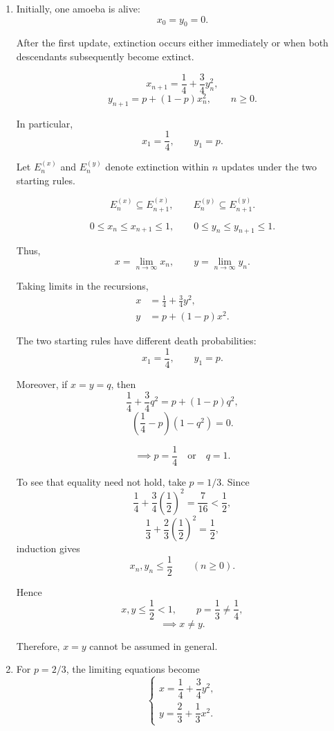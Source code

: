 \documentclass[11pt,a4paper]{article}
\begin{document}
\begin{enumerate}


\item[(a)]

Initially, one amoeba is alive:
\[
x_0=y_0=0.
\]

After the first update, extinction occurs either immediately
or when both descendants subsequently become extinct.

\[
x_{n+1}
=\frac14+\frac34 y_n^2,
\]
\[
y_{n+1}
=p+(1-p)x_n^2,
\qquad n\geq0.
\]

In particular,
\[
x_1=\frac14,\qquad y_1=p.
\]

Let $E_n^{(x)}$ and $E_n^{(y)}$ denote extinction within
$n$ updates under the two starting rules.

\[
E_n^{(x)}\subseteq E_{n+1}^{(x)},
\qquad
E_n^{(y)}\subseteq E_{n+1}^{(y)}.
\]

\[
0\leq x_n\leq x_{n+1}\leq1,
\qquad
0\leq y_n\leq y_{n+1}\leq1.
\]

Thus,
\[
x=\lim_{n\to\infty}x_n,
\qquad
y=\lim_{n\to\infty}y_n.
\]

Taking limits in the recursions,
\[
\begin{aligned}
x&=\frac14+\frac34 y^2,\\
y&=p+(1-p)x^2.
\end{aligned}
\]

The two starting rules have different death probabilities:
\[
x_1=\frac14,\qquad y_1=p.
\]

Moreover, if $x=y=q$, then
\[
\frac14+\frac34q^2
=p+(1-p)q^2,
\]
\[
\left(\frac14-p\right)(1-q^2)=0.
\]

\[
\implies
p=\frac14
\quad\text{or}\quad
q=1.
\]

To see that equality need not hold, take $p=1/3$.
Since
\[
\frac14+\frac34\left(\frac12\right)^2
=\frac7{16}<\frac12,
\]
\[
\frac13+\frac23\left(\frac12\right)^2
=\frac12,
\]
induction gives
\[
x_n,y_n\leq\frac12
\qquad(n\geq0).
\]

Hence
\[
x,y\leq\frac12<1,
\qquad p=\frac13\ne\frac14,
\]
\[
\implies x\ne y.
\]

Therefore, $x=y$ cannot be assumed in general.


\item[(b)]

For $p=2/3$, the limiting equations become
\[
\begin{cases}
x=\dfrac14+\dfrac34y^2,\\[6pt]
y=\dfrac23+\dfrac13x^2.
\end{cases}
\]


\end{enumerate}
\end{document}
